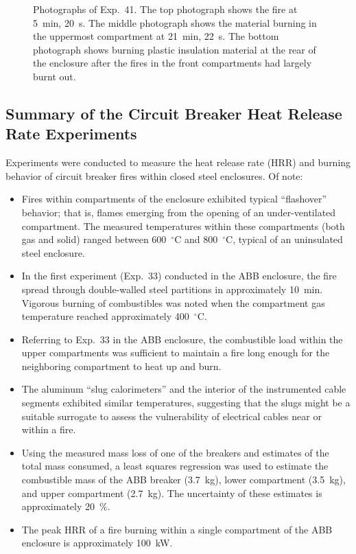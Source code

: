 \begin{figure}[p]
\caption[Photographs of Exp.~41]{Photographs of Exp.~41. The top photograph shows the fire at 5~min, 20~s. The middle photograph shows the material burning in the uppermost compartment at 21~min, 22~s. The bottom photograph shows burning plastic insulation material at the rear of the enclosure after the fires in the front compartments had largely burnt out. }
\label{fig:Test_41_photos}
\end{figure}


\clearpage

\subsection{Summary of the Circuit Breaker Heat Release Rate Experiments}

Experiments were conducted to measure the heat release rate (HRR) and burning behavior of circuit breaker fires within closed steel enclosures. Of note:
\begin{itemize}
\item Fires within compartments of the enclosure exhibited typical ``flashover'' behavior; that is, flames emerging from the opening of an under-ventilated compartment. The measured temperatures within these compartments (both gas and solid) ranged between 600~$^\circ$C and 800~$^\circ$C, typical of an uninsulated steel enclosure.
\item In the first experiment (Exp.~33) conducted in the ABB enclosure, the fire spread through double-walled steel partitions in approximately 10~min. Vigorous burning of combustibles was noted when the compartment gas temperature reached approximately 400~$^\circ$C.
\item Referring to Exp.~33 in the ABB enclosure, the combustible load within the upper compartments was sufficient to maintain a fire long enough for the neighboring compartment to heat up and burn.
\item The aluminum ``slug calorimeters'' and the interior of the instrumented cable segments exhibited similar temperatures, suggesting that the slugs might be a suitable surrogate to assess the vulnerability of electrical cables near or within a fire.
\item Using the measured mass loss of one of the breakers and estimates of the total mass consumed, a least squares regression was used to estimate the combustible mass of the ABB breaker (3.7~kg), lower compartment (3.5~kg), and upper compartment (2.7~kg). The uncertainty of these estimates is approximately 20~\%.
\item The peak HRR of a fire burning within a single compartment of the ABB enclosure is approximately 100~kW.
\end{itemize}





